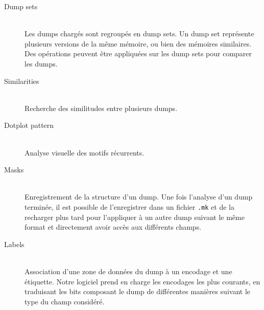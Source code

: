 \begin{description}
  \item[Dump sets] \hfill \\
  Les dumps chargés sont regroupés en dump sets. Un dump set représente plusieurs versions de la même mémoire, ou bien des mémoires similaires. Des opérations peuvent être appliquées sur les dump sets pour comparer les dumps.

  \item[Similarities] \hfill \\
  Recherche des similitudes entre plusieurs dumps.

  \item[Dotplot pattern] \hfill \\
  Analyse visuelle des motifs récurrents.

  \item[Masks] \hfill \\
  Enregistrement de la structure d'un dump. Une fois l'analyse d'un dump terminée, il est possible de l'enregistrer dans un fichier \texttt{.mk} et de la recharger plus tard pour l'appliquer à un autre dump suivant le même format et directement avoir accès aux différents champs.

  \item[Labels] \hfill \\
  Association d'une zone de données du dump à un encodage et une étiquette. Notre logiciel prend en charge les encodages les plus courants, en traduisant les bits composant le dump de différentes manières suivant le type du champ considéré.
\end{description}
